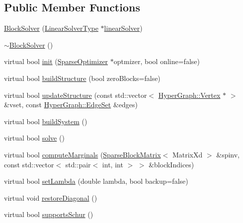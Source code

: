 \subsection*{Public Member Functions}
\begin{DoxyCompactItemize}
\item 
\hyperlink{classg2o_1_1BlockSolver_a04701a223a14708c9c84ce4d7e7af3f6}{Block\+Solver} (\hyperlink{classg2o_1_1BlockSolver_a717fa8cb1dd5a212e41d8ebef67955e6}{Linear\+Solver\+Type} $\ast$\hyperlink{classg2o_1_1BlockSolver_adb09637f5f87327d26928f672d6caadf}{linear\+Solver})
\item 
\hyperlink{classg2o_1_1BlockSolver_a7587b13ec3494c00ad95a3d0ce7fd9a9}{$\sim$\+Block\+Solver} ()
\item 
virtual bool \hyperlink{classg2o_1_1BlockSolver_a8bf01018abc3bfddfa3b29a380a1d6cb}{init} (\hyperlink{classg2o_1_1SparseOptimizer}{Sparse\+Optimizer} $\ast$optmizer, bool online=false)
\item 
virtual bool \hyperlink{classg2o_1_1BlockSolver_a17e4392d3cca9a9d7cf38bb46d073b86}{build\+Structure} (bool zero\+Blocks=false)
\item 
virtual bool \hyperlink{classg2o_1_1BlockSolver_acc497239c5e681ddec2140e34dfc5938}{update\+Structure} (const std\+::vector$<$ \hyperlink{classg2o_1_1HyperGraph_1_1Vertex}{Hyper\+Graph\+::\+Vertex} $\ast$ $>$ \&vset, const \hyperlink{classg2o_1_1HyperGraph_a5e2970e236c0dcb4eff7c205d7b6b4ae}{Hyper\+Graph\+::\+Edge\+Set} \&edges)
\item 
virtual bool \hyperlink{classg2o_1_1BlockSolver_a2654a8d52f38e5ce23720a8de302e2e7}{build\+System} ()
\item 
virtual bool \hyperlink{classg2o_1_1BlockSolver_a589a75a131cce100c1945ad2786214d7}{solve} ()
\item 
virtual bool \hyperlink{classg2o_1_1BlockSolver_ac21cd7e2c9b8a1414f7a2dccb0d30a0e}{compute\+Marginals} (\hyperlink{classg2o_1_1SparseBlockMatrix}{Sparse\+Block\+Matrix}$<$ Matrix\+Xd $>$ \&spinv, const std\+::vector$<$ std\+::pair$<$ int, int $>$ $>$ \&block\+Indices)
\item 
virtual bool \hyperlink{classg2o_1_1BlockSolver_acc63a23e5b35e4f72d46dc22719aa56f}{set\+Lambda} (double lambda, bool backup=false)
\item 
virtual void \hyperlink{classg2o_1_1BlockSolver_a2136931d7aa2f54df5207556c4685809}{restore\+Diagonal} ()
\item 
virtual bool \hyperlink{classg2o_1_1BlockSolver_a68dc822ce48e80ceacce69c7bd029674}{supports\+Schur} ()
\item 

\end{DoxyCompactItemize}
